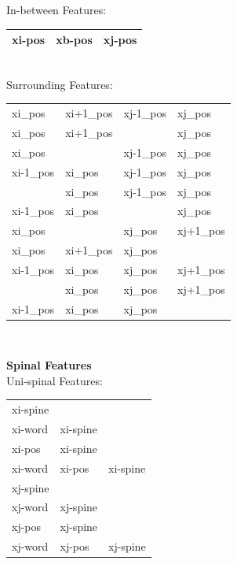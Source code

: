 \documentclass[11pt]{article}
\begin{document}
In-between Features: \\

\begin{tabular}{|l l l|}
	\hline
		xi-pos& xb-pos& xj-pos \\
	\hline
\end{tabular} \\



Surrounding Features: \\

\begin{tabular}{|l l l l |}
	\hline
		xi\_pos& xi+1\_pos & xj-1\_pos & xj\_pos \\
		xi\_pos& xi+1\_pos &           & xj\_pos \\
		xi\_pos&           & xj-1\_pos & xj\_pos \\
		xi-1\_pos& xi\_pos & xj-1\_pos & xj\_pos \\
		         & xi\_pos & xj-1\_pos & xj\_pos \\
		xi-1\_pos& xi\_pos &           & xj\_pos \\
		xi\_pos&           & xj\_pos & xj+1\_pos \\
		xi\_pos& xi+1\_pos & xj\_pos &           \\
		xi-1\_pos& xi\_pos & xj\_pos & xj+1\_pos \\
		         & xi\_pos & xj\_pos & xj+1\_pos \\
		xi-1\_pos& xi\_pos & xj\_pos &           \\
	\hline
\end{tabular} \\
            
            
            
\vspace{1cm}            
       
\textbf{Spinal Features} \\
 
       
Uni-spinal Features: \\

\begin{tabular}{|l l l|}
	\hline
    	xi-spine&&\\
		xi-word& xi-spine& \\
		xi-pos& xi-spine& \\
        xi-word& xi-pos& xi-spine \\
    	xj-spine&&\\
		xj-word& xj-spine& \\
		xj-pos& xj-spine& \\
        xj-word& xj-pos& xj-spine \\
	\hline
\end{tabular} \\
\end{document}
